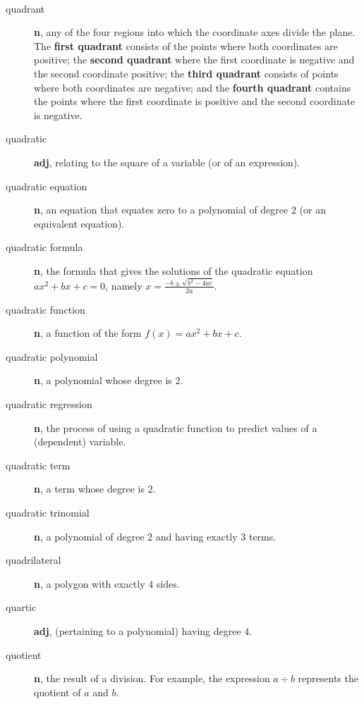 \documentclass[10pt,]{book}
\newcommand{\terminology}[1]{\textbf{#1}}
\theoremstyle{plain}
\theoremstyle{definition}
\theoremstyle{definition}
\theoremstyle{definition}
\numberwithin{equation}{part}
\begin{document}
\paragraph[{}]{}\hypertarget{paragraphs-20}{}
\leavevmode%
\begin{description}
\item[{quadrant}]\hypertarget{li-739}{}\terminology{n}, any of the four regions into which the coordinate axes divide the plane. The \terminology{first quadrant} consists of the points where both coordinates are positive; the \terminology{second quadrant} where the first coordinate is negative and the second coordinate positive; the \terminology{third quadrant} consists of points where both coordinates are negative; and the \terminology{fourth quadrant} contains the points where the first coordinate is positive and the second coordinate is negative.%
\item[{quadratic}]\hypertarget{li-740}{}\terminology{adj}, relating to the square of a variable (or of an expression).%
\item[{quadratic equation}]\hypertarget{li-741}{}\terminology{n}, an equation that equates zero to a polynomial of degree \(2\) (or an equivalent equation).%
\item[{quadratic formula}]\hypertarget{li-742}{}\terminology{n}, the formula that gives the solutions of the quadratic equation \(ax^2 + bx + c = 0\), namely \(x = \frac{−b±\sqrt{b^2−4ac}}{2a}\).%
\item[{quadratic function}]\hypertarget{li-743}{}\terminology{n}, a function of the form \(f (x) = ax^2 + bx + c\).%
\item[{quadratic polynomial}]\hypertarget{li-744}{}\terminology{n}, a polynomial whose degree is \(2\).%
\item[{quadratic regression}]\hypertarget{li-745}{}\terminology{n}, the process of using a quadratic function to predict values of a (dependent) variable.%
\item[{quadratic term}]\hypertarget{li-746}{}\terminology{n}, a term whose degree is \(2\).%
\item[{quadratic trinomial}]\hypertarget{li-747}{}\terminology{n}, a polynomial of degree \(2\) and having exactly \(3\) terms.%
\item[{quadrilateral}]\hypertarget{li-748}{}\terminology{n}, a polygon with exactly \(4\) sides.%
\item[{quartic}]\hypertarget{li-749}{}\terminology{adj}, (pertaining to a polynomial) having degree \(4\).%
\item[{quotient}]\hypertarget{li-750}{}\terminology{n}, the result of a division. For example, the expression \(a \div b\) represents the quotient of \(a\) and \(b\).%
\end{description}
%
\typeout{************************************************}
\typeout{************************************************}
\end{document}
